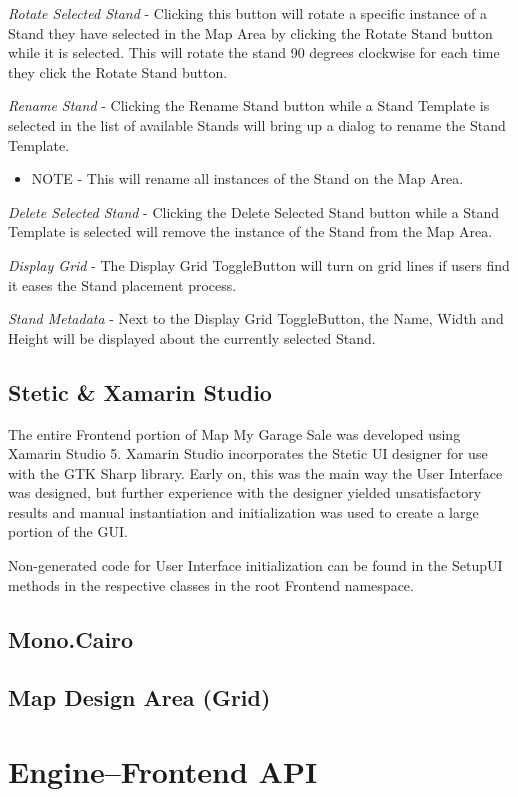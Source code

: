 \documentclass{report}
\begin{document}
\emph{Rotate Selected Stand} - Clicking this button will rotate a specific instance of
 a Stand they have selected in the Map Area by clicking the Rotate Stand button while 
it is selected.  This will rotate the stand 90 degrees clockwise for each time they click 
the Rotate Stand button.

\emph{Rename Stand} - Clicking the Rename Stand button while a Stand Template is 
selected in the list of available Stands will bring up a dialog to rename the Stand Template.  

\begin{itemize}
	\item NOTE - This will rename all instances of the Stand on the Map Area.
\end{itemize}

\emph{Delete Selected Stand} - Clicking the Delete Selected Stand button while a 
Stand Template is selected will remove the instance of the Stand from the Map Area.

\emph{Display Grid} - The Display Grid ToggleButton will turn on grid lines if users 
find it eases the Stand placement process.

\emph{Stand Metadata} - Next to the Display Grid ToggleButton, the Name, Width
 and Height will be displayed about the currently selected Stand.

\section{Stetic \& Xamarin Studio}
The entire Frontend portion of Map My Garage Sale was developed using Xamarin
 Studio 5.  Xamarin Studio incorporates the Stetic UI designer for use with the GTK
 Sharp library.  Early on, this was the main way the User Interface was designed, but
 further experience with the designer yielded unsatisfactory results and manual
 instantiation and initialization was used to create a large portion of the GUI.

Non-generated code for User Interface initialization can be found in the SetupUI 
methods in the respective classes in the root Frontend namespace.


\section{Mono.Cairo}

\section{Map Design Area (Grid)}



\chapter{Engine--Frontend API}
\end{document}

